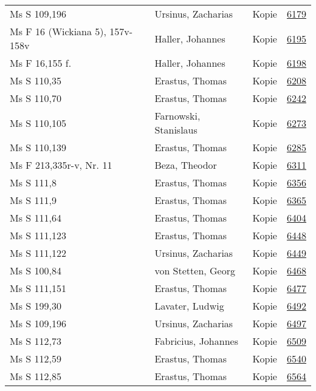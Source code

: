 \documentclass[10pt,a4paper,landscape]{report}
\begin{document}
\begin{longtable}{p{16cm}p{4cm}lr}
Ms S 109,196	&	Ursinus, Zacharias	&	Kopie	&	\href{http://130.60.24.72/assignment/6179}{6179}\\
Ms F 16 (Wickiana 5), 157v-158v	&	Haller, Johannes	&	Kopie	&	\href{http://130.60.24.72/assignment/6195}{6195}\\
Ms F 16,155 f.	&	Haller, Johannes	&	Kopie	&	\href{http://130.60.24.72/assignment/6198}{6198}\\
Ms S 110,35	&	Erastus, Thomas	&	Kopie	&	\href{http://130.60.24.72/assignment/6208}{6208}\\
Ms S 110,70	&	Erastus, Thomas	&	Kopie	&	\href{http://130.60.24.72/assignment/6242}{6242}\\
Ms S 110,105	&	Farnowski, Stanislaus	&	Kopie	&	\href{http://130.60.24.72/assignment/6273}{6273}\\
Ms S 110,139	&	Erastus, Thomas	&	Kopie	&	\href{http://130.60.24.72/assignment/6285}{6285}\\
Ms F 213,335r-v, Nr. 11	&	Beza, Theodor	&	Kopie	&	\href{http://130.60.24.72/assignment/6311}{6311}\\
Ms S 111,8	&	Erastus, Thomas	&	Kopie	&	\href{http://130.60.24.72/assignment/6356}{6356}\\
Ms S 111,9	&	Erastus, Thomas	&	Kopie	&	\href{http://130.60.24.72/assignment/6365}{6365}\\
Ms S 111,64	&	Erastus, Thomas	&	Kopie	&	\href{http://130.60.24.72/assignment/6404}{6404}\\
Ms S 111,123	&	Erastus, Thomas	&	Kopie	&	\href{http://130.60.24.72/assignment/6448}{6448}\\
Ms S 111,122	&	Ursinus, Zacharias	&	Kopie	&	\href{http://130.60.24.72/assignment/6449}{6449}\\
Ms S 100,84	&	von Stetten, Georg	&	Kopie	&	\href{http://130.60.24.72/assignment/6468}{6468}\\
Ms S 111,151	&	Erastus, Thomas	&	Kopie	&	\href{http://130.60.24.72/assignment/6477}{6477}\\
Ms S 199,30	&	Lavater, Ludwig	&	Kopie	&	\href{http://130.60.24.72/assignment/6492}{6492}\\
Ms S 109,196	&	Ursinus, Zacharias	&	Kopie	&	\href{http://130.60.24.72/assignment/6497}{6497}\\
Ms S 112,73	&	Fabricius, Johannes	&	Kopie	&	\href{http://130.60.24.72/assignment/6509}{6509}\\
Ms S 112,59	&	Erastus, Thomas	&	Kopie	&	\href{http://130.60.24.72/assignment/6540}{6540}\\
Ms S 112,85	&	Erastus, Thomas	&	Kopie	&	\href{http://130.60.24.72/assignment/6564}{6564}\\

\end{longtable}
\end{document}
